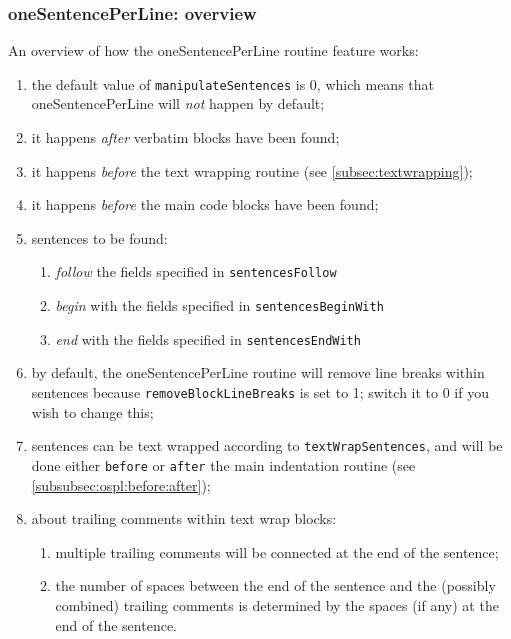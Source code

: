 \subsubsection{oneSentencePerLine: overview}
 An overview of how the oneSentencePerLine routine feature works:
 \begin{enumerate}
  \item the default value of \texttt{manipulateSentences} is 0, which means that
        oneSentencePerLine will \emph{not} happen by default;
  \item it happens \emph{after} verbatim blocks have been found;
  \item it happens \emph{before} the text wrapping routine (see
        \cref{subsec:textwrapping});
  \item it happens \emph{before} the main code blocks have been found;
  \item sentences to be found:
        \begin{enumerate}
         \item \emph{follow} the fields specified in \texttt{sentencesFollow}
         \item \emph{begin} with the fields specified in \texttt{sentencesBeginWith}
         \item \emph{end} with the fields specified in \texttt{sentencesEndWith}
        \end{enumerate}
  \item by default, the oneSentencePerLine routine will remove line breaks within
        sentences because \texttt{removeBlockLineBreaks} is set to 1; switch it to 0 if
        you wish to change this;
  \item sentences can be text wrapped according to \texttt{textWrapSentences}, and will
        be done either \texttt{before} or \texttt{after} the main indentation routine
        (see \cref{subsubsec:ospl:before:after});
  \item about trailing comments within text wrap blocks:
        \begin{enumerate}
         \item multiple trailing comments will be connected at the end of the sentence;
         \item the number of spaces between the end of the sentence and the (possibly
               combined) trailing comments is determined by the spaces (if any) at the
               end of the sentence.
        \end{enumerate}
 \end{enumerate}

